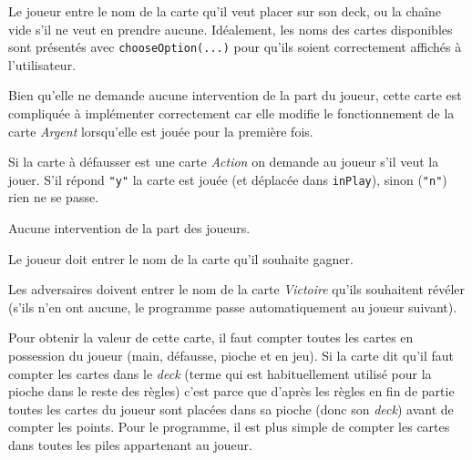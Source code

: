 \documentclass[12pt]{td}
\begin{document}
{Le joueur entre le nom de la carte qu'il veut placer sur son deck, ou la chaîne vide s'il ne veut en prendre aucune. Idéalement, les noms des cartes disponibles sont présentés avec \texttt{chooseOption(...)} pour qu'ils soient correctement affichés à l'utilisateur.}

{Bien qu'elle ne demande aucune intervention de la part du joueur, cette carte est compliquée à implémenter correctement car elle modifie le fonctionnement de la carte \emph{Argent} lorsqu'elle est jouée pour la première fois.}

{Si la carte à défausser est une carte \emph{Action} on demande au joueur s'il veut la jouer. S'il répond \texttt{"y"} la carte est jouée (et déplacée dans \texttt{inPlay}), sinon (\texttt{"n"}) rien ne se passe.}

{Aucune intervention de la part des joueurs.}

{Le joueur doit entrer le nom de la carte qu'il souhaite gagner.}

{Les adversaires doivent entrer le nom de la carte \emph{Victoire} qu'ils souhaitent révéler (s'ils n'en ont aucune, le programme passe automatiquement au joueur suivant).}

{Pour obtenir la valeur de cette carte, il faut compter toutes les cartes en possession du joueur (main, défausse, pioche et en jeu). Si la carte dit qu'il faut compter les cartes dans le \emph{deck} (terme qui est habituellement utilisé pour la pioche dans le reste des règles) c'est parce que d'après les règles en fin de partie toutes les cartes du joueur sont placées dans sa pioche (donc son \emph{deck}) avant de compter les points. Pour le programme, il est plus simple de compter les cartes dans toutes les piles appartenant au joueur.}
\end{document}
